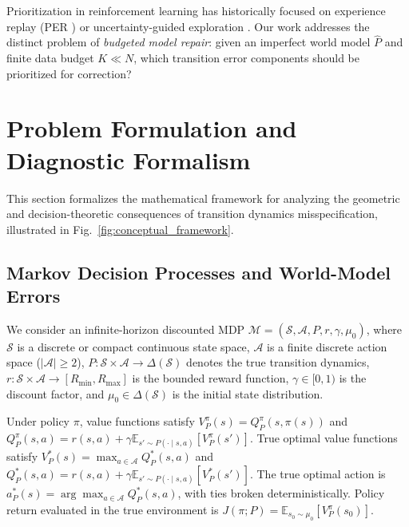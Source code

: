 \documentclass[journal,10pt,twocolumn]{IEEEtran}
\begin{document}
Prioritization in reinforcement learning has historically focused on experience replay (PER \cite{schaul2015prioritized}) or uncertainty-guided exploration \cite{buckman2018sample, yu2020mopo}. 
Our work addresses the distinct problem of \emph{budgeted model repair}: given an imperfect world model $\hat{P}$ and finite data budget $K \ll N$, which transition error components should be prioritized for correction?

\section{Problem Formulation and Diagnostic Formalism}
\label{sec:problem_formulation}

This section formalizes the mathematical framework for analyzing the geometric and decision-theoretic consequences of transition dynamics misspecification, illustrated in Fig.~\ref{fig:conceptual_framework}.

\subsection{Markov Decision Processes and World-Model Errors}
\label{subsec:mdp_formulation}

We consider an infinite-horizon discounted MDP $\mathcal{M} = (\mathcal{S}, \mathcal{A}, P, r, \gamma, \mu_0)$, where $\mathcal{S}$ is a discrete or compact continuous state space, $\mathcal{A}$ is a finite discrete action space ($|\mathcal{A}| \ge 2$), $P: \mathcal{S} \times \mathcal{A} \rightarrow \Delta(\mathcal{S})$ denotes the true transition dynamics, $r: \mathcal{S} \times \mathcal{A} \rightarrow [R_{\min}, R_{\max}]$ is the bounded reward function, $\gamma \in [0, 1)$ is the discount factor, and $\mu_0 \in \Delta(\mathcal{S})$ is the initial state distribution.

Under policy $\pi$, value functions satisfy $V_P^\pi(s) = Q_P^\pi(s, \pi(s))$ and $Q_P^\pi(s, a) = r(s, a) + \gamma \mathbb{E}_{s' \sim P(\cdot \mid s, a)}[ V_P^\pi(s') ]$. 
True optimal value functions satisfy $V_P^*(s) = \max_{a \in \mathcal{A}} Q_P^*(s, a)$ and $Q_P^*(s, a) = r(s, a) + \gamma \mathbb{E}_{s' \sim P(\cdot \mid s, a)}[ V_P^*(s') ]$. 
The true optimal action is $a_P^*(s) = \arg\max_{a \in \mathcal{A}} Q_P^*(s, a)$, with ties broken deterministically. Policy return evaluated in the true environment is $J(\pi; P) = \mathbb{E}_{s_0 \sim \mu_0}[ V_P^\pi(s_0) ]$.
\end{document}
